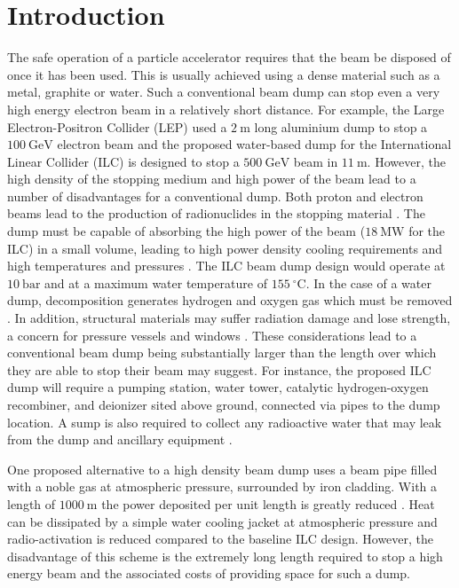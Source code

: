 \documentclass[aip,pop,preprint,superscriptaddress]{revtex4-1}
\begin{document}
\section{Introduction}
The safe operation of a particle accelerator requires that the beam be disposed of once it has been used. This is usually achieved using a dense material such as a metal, graphite or water. Such a conventional beam dump can stop even a very high energy electron beam in a relatively short distance. For example, the Large Electron-Positron Collider (LEP) used a $2\mathrm{\ m}$ long aluminium dump to stop a $100\mathrm{\ GeV}$ electron beam \cite{LEP} and the proposed water-based dump for the International Linear Collider (ILC) \cite{ILC_TDR, ILC_dump} is designed to stop a $500\mathrm{\ GeV}$ beam in $11\mathrm{\ m}$. However, the high density of the stopping medium and high power of the beam lead to a number of disadvantages for a conventional dump. Both proton and electron beams lead to the production of radionuclides in the stopping material \cite{Radionuclides_proton,Radionuclides_electron}. The dump must be capable of absorbing the high power of the beam ($18\mathrm{\ MW}$ for the ILC) in a small volume, leading to high power density cooling requirements and high temperatures and pressures \cite{ILC_dump}. The ILC beam dump design would operate at $10\mathrm{\ bar}$ and at a maximum water temperature of $155\mathrm{\ {^\circ} C}$. In the case of a water dump, decomposition generates hydrogen and oxygen gas which must be removed \cite{ILC_TDR,SLAC_dump}. In addition, structural materials may suffer radiation damage and lose strength, a concern for pressure vessels and windows \cite{OECD_radiation_damage,SLAC_dump}. These considerations lead to a conventional beam dump being substantially larger than the length over which they are able to stop their beam may suggest. For instance, the proposed ILC dump will require a pumping station, water tower, catalytic hydrogen-oxygen recombiner, and deionizer sited above ground, connected via pipes to the dump location. A sump is also required to collect any radioactive water that may leak from the dump and ancillary equipment \cite{ILC_dump}.

One proposed alternative to a high density beam dump uses a beam pipe filled with a noble gas at atmospheric pressure, surrounded by iron cladding. With a length of $1000{\mathrm{\ m}}$ the power deposited per unit length is greatly reduced \cite{Leuschner}. Heat can be dissipated by a simple water cooling jacket at atmospheric pressure and radio-activation is reduced compared to the baseline ILC design. However, the disadvantage of this scheme is the extremely long length required to stop a high energy beam and the associated costs of providing space for such a dump.
\end{document}
